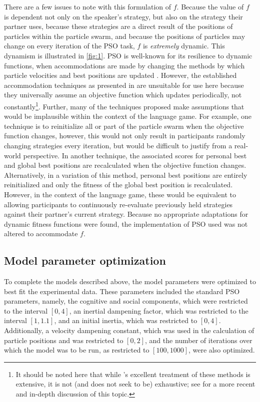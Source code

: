 \documentclass[12pt,a4paper]{article}
\begin{document}
There are a few issues to note with this formulation of $f$. Because the value of $f$ is dependent not only on the speaker's strategy, but also on the strategy their partner uses, because these strategies are a direct result of the positions of particles within the particle swarm, and because the positions of particles may change on every iteration of the PSO task, $f$ is \textit{extremely} dynamic. This dynamism is illustrated in \autoref{fig:1}. PSO is well-known for its resilience to dynamic functions, when accommodations are made by changing the methods by which particle velocities and best positions are updated \citep{engelbrecht2005}. However, the established accommodation techniques as presented in \cite{engelbrecht2005} are unsuitable for use here because they universally assume an objective function which updates periodically, not constantly\footnote{It should be noted here that while \citeauthor{engelbrecht2005}'s excellent treatment of these methods is extensive, it is not (and does not seek to be) exhaustive; see \cite{blackwell2007} for a more recent and in-depth discussion of this topic.}. Further, many of the techniques proposed make assumptions that would be implausible within the context of the \citeauthor{rohde2012} language game. For example, one technique is to reinitialize all or part of the particle swarm when the objective function changes, however, this would not only result in participants randomly changing strategies every iteration, but would be difficult to justify from a real-world perspective. In another technique, the associated scores for personal best and global best positions are recalculated when the objective function changes. Alternatively, in a variation of this method, personal best positions are entirely reinitialized and only the fitness of the global best position is recalculated. However, in the context of the language game, these would be equivalent to allowing participants to continuously re-evaluate previously held strategies against their partner's current strategy. Because no appropriate adaptations for dynamic fitness functions were found, the implementation of PSO used was not altered to accommodate $f$.

\subsection{Model parameter optimization}
\label{sec:param_opt}
To complete the models described above, the model parameters were optimized to best fit the experimental data. These parameters included the standard PSO parameters, namely, the cognitive and social components, which were restricted to the interval $[0,4]$, an inertial dampening factor, which was restricted to the interval $[1,1.1]$, and an initial inertia, which was restricted to $[0,4]$. Additionally, a velocity dampening constant, which was used in the calculation of particle positions and was restricted to $[0,2]$, and the number of iterations over which the model was to be run, as restricted to $[100,1000]$, were also optimized.
\end{document}
